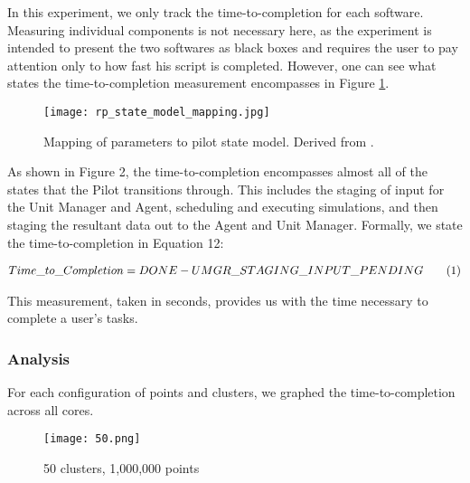 \documentclass[]{article}
\newcommand\numberthis{\addtocounter{equation}{1}\tag{\theequation}}
\begin{document}
			In this experiment, we only track the time-to-completion for each software. Measuring individual components is not necessary here, as the experiment is intended to present the two softwares as black boxes and requires the user to pay attention only to how fast his script is completed. However, one can see what states the time-to-completion measurement encompasses in Figure \ref{fig:pilot_state_mapping}.

			\begin{figure}[H]
				\centering
				\texttt{[image: rp\_state\_model\_mapping.jpg]}
				\caption{Mapping of parameters to pilot state model. Derived from \cite{rp_state_diagram}.}
				\label{fig:pilot_state_mapping}
			\end{figure}

			As shown in Figure 2, the time-to-completion encompasses almost all of the states that the Pilot transitions through. This includes the staging of input for the Unit Manager and Agent, scheduling and executing simulations, and then staging the resultant data out to the Agent and Unit Manager. Formally, we state the time-to-completion in Equation 12:

			\begin{align*}
				Time\_to\_Completion = DONE - UMGR\_STAGING\_INPUT\_PENDING \numberthis \label{12}
			\end{align*}

			This measurement, taken in seconds, provides us with the time necessary to complete a user's tasks.

		\subsubsection{Analysis}

			For each configuration of points and clusters, we graphed the time-to-completion across all cores.

			\begin{figure}[H]
				\centering
				\texttt{[image: 50.png]}
				\caption{50 clusters, 1,000,000 points}
				\label{fig:50}
			\end{figure}
\end{document}
